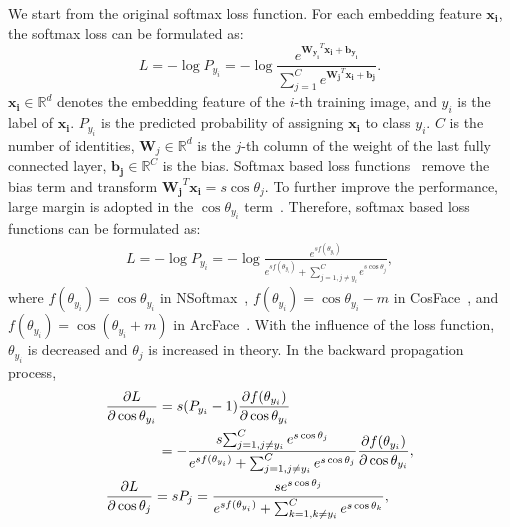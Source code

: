 \documentclass[journal,comsoc]{IEEEtran}
\begin{document}
We start from the original softmax loss function. For each embedding feature $\bm{{x_i}}$, the softmax loss can be formulated as:
\begin{equation}
L =  - \log {P_{y_i}} = -  \log  \frac{{{e^{\bm{{W_{{y_i}}}}^T\bm{{x_i}} + \bm{{b_{{y_i}}}}}}}}{{\sum\nolimits_{j = 1}^C {{e^{\bm{{W_j}}^T\bm{{x_i}} + \bm{{b_j}}}}} }}.
\end{equation}
$\bm{{x_i}} \in {\mathbb{R}^d}$ denotes the embedding feature of the $i$-th training image, and $y_i$ is the label of $\bm{{x_i}}$. ${P_{y_i}}$ is the predicted probability of assigning $\bm{{x_i}}$ to class $y_i$. $C$ is the number of identities, ${{\bm{W}_{j}}} \in {\mathbb{R}^{d}}$ is the $j$-th column of the weight of the last fully connected layer, $\bm{b_j}\in {\mathbb{R}^{C}}$ is the bias. Softmax based loss functions~\cite{wang2017normface,Liu2017SphereFace,Wang2018CosFace,deng2019arcface} remove the bias term and transform $\bm{{W_j}}^T\bm{{x_i}} = s\cos {\theta_j}$. To further improve the performance, large margin is adopted in the $\cos{\theta_{y_i}}$ term~\cite{Liu2017SphereFace,Wang2018CosFace,deng2019arcface}. Therefore, softmax based loss functions can be formulated as:
\begin{equation}
\label{equation:osoft}
\begin{gathered}
L =  - \log {P_{y_i}} = - \log \frac{{{e^{sf(\theta _{{y_i}})}}}}{{{e^{sf(\theta _{{y_i}})}} + \sum\nolimits_{j = 1,j \ne {y_i}}^C {{e^{s\cos {\theta _j}}}} }}, 
\end{gathered}\end{equation}where $f(\theta _{{y_i}}) = \cos {\theta _{{y_i}}}$ in NSoftmax~\cite{wang2017normface}, $f(\theta _{{y_i}}) = \cos {\theta _{{y_i}}} - m$ in CosFace~\cite{Wang2018CosFace}, and $f(\theta _{{y_i}}) = \cos ({\theta _{{y_i}}} + m)$ in ArcFace~\cite{deng2019arcface}. With the influence of the loss function, $\theta _{{y_i}}$ is decreased and $\theta_j$ is increased in theory. In the backward propagation process, 
\begin{equation}
\label{equation:soft}
\begin{gathered}
\frac{{\partial L}}{{\partial \cos {\theta _{{y_i}}}}} = s({P_{{y_i}}} - 1)\frac{{\partial f({\theta _{{y_i}}})}}{{\partial \cos {\theta _{{y_i}}}}} \hfill \\
\qquad\quad\quad=-\frac{s{\sum\nolimits_{j = 1,j \ne {y_i}}^C {{e^{s\cos {\theta _j}}}} }}{{{e^{sf({\theta _{{y_i}}})}} + \sum\nolimits_{j = 1,j \ne {y_i}}^C {{e^{s\cos {\theta _j}}}} }}\frac{{\partial f({\theta _{{y_i}}})}}{{\partial \cos {\theta _{{y_i}}}}},\\
\frac{{\partial L}}{{\partial \cos {\theta _j}}} = s{P_j}
= \frac{{s{e^{s\cos {\theta _j}}}}}{{{e^{sf( {\theta _{{y_i}}})}} + \sum\nolimits_{k = 1,k \ne {y_i}}^C {{e^{s\cos {\theta _k}}}} }},\hfill\\ 
\end{gathered}
\end{equation}
\end{document}
